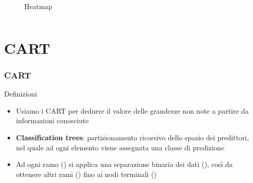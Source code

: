 \begin{frame}
\begin{columns}
\begin{column}{0.55\textwidth}
\begin{center}
\begin{figure}
						\caption{Heatmap}
					\end{figure}
				\end{center}
			\end{column}
		\end{columns}
	\end{frame}

\section{CART}

	\begin{frame}
		\frametitle{CART}
		\begin{block}{Definizioni}
			\begin{itemize}
				\item Usiamo i CART per dedurre il valore delle grandezze non note a partire da informazioni conosciute
				\item \textbf{Classification trees}: partizionamento ricorsivo dello spazio dei predittori, nel quale ad ogni elemento viene assegnata una classe di predizione
				\item Ad ogni ramo () si applica una separazione binaria dei dati (), così da ottenere altri rami () fino ai nodi terminali ()
			\end{itemize}
		\end{block}
	\end{frame}

